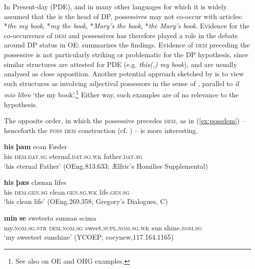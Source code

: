 \documentclass[output=paper,colorlinks,citecolor=brown]{langscibook}
\begin{document}
In Present-day  (PDE), and in many other languages for which it is widely assumed that the  is the head of DP,  possessives may not co-occur with articles: *\emph{the my book}, *\emph{my the book}, *\emph{Mary's the book}, *\emph{the Mary's book}. Evidence for the co-occurrence of \textsc{dem} and possessives has therefore played a role in the debate around DP status in OE: \citet[§4]{Wood2007} summarizes the findings. Evidence of \textsc{dem} preceding the possessive is not particularly striking or problematic for the DP hypothesis, since similar structures are attested for PDE (e.g. \emph{this(,) my book}), and are usually analysed as close apposition. Another potential approach sketched by \citet{Wood2007} is to view such structures as involving adjectival possessors in the sense of \citet{Lyons1986,Lyons1999}, parallel to  \textit{il mio libro} `the my book'.\footnote{See also \citet{Demske01} on OE and OHG examples.} Either way, such examples are of no relevance to the  hypothesis.

The opposite order, in which the possessive precedes \textsc{dem}, as in (\ref{ex:possdem}) -- henceforth the \textsc{poss} \textsc{dem} construction (cf. \citealp{Sommerer2018}) -- is more interesting. 

\begin{exe}     
 \ex\label{ex:possdem}
 \begin{xlist}
     \ex\gll\textbf{his} \textbf{þam} ecan Fæder\\
     his \textsc{dem.dat.sg} eternal.\textsc{dat.sg.wk} father.\textsc{dat.sg}\\
     \glt `his eternal Father'   (OEng.813.633; Ælfric's Homilies Supplemental)

     \ex\gll\textbf{his} \textbf{þæs} clænan lifes\\
     his \textsc{dem.gen.sg} clean.\textsc{gen.sg.wk} life.\textsc{gen.sg}\\
     \glt `his clean life'   (OEng.269.358; Gregory's Dialogues, C)

     \ex\label{ex:possdemc}\gll\textbf{min} \textbf{se} swetesta sunnan scima\\
     my.\textsc{nom.sg.str} \textsc{dem.nom.sg} sweet.\textsc{supl.nom.sg.wk} sun shine.\textsc{nom.sg}\\
     \glt `my sweetest sunshine'   (YCOEP; cocynew,117.164.1165)
 \end{xlist}
\end{exe}
\end{document}
